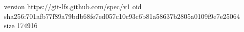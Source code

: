 version https://git-lfs.github.com/spec/v1
oid sha256:701afb77f89a79bdb68fe7ed057c10c93c6b81a58637b2805a0109f9e7e25064
size 174916
